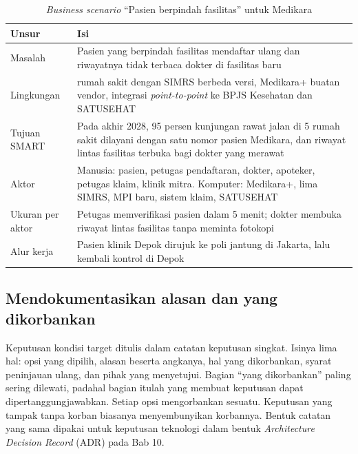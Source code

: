 \begin{table}[!htb]
  \centering
  \caption{\textit{Business scenario} ``Pasien berpindah fasilitas'' untuk Medikara}
  \label{tab:ch08-business-scenario}
  \begin{tabularx}{\textwidth}{>{\raggedright\arraybackslash}p{2.8cm}>{\raggedright\arraybackslash}X}
    \hline
    \textbf{Unsur} & \textbf{Isi} \\
    \hline
    Masalah & Pasien yang berpindah fasilitas mendaftar ulang dan riwayatnya tidak terbaca
      dokter di fasilitas baru \\
    \hline
    Lingkungan & 5 rumah sakit dengan SIMRS berbeda versi, Medikara+ buatan vendor,
      integrasi \textit{point-to-point} ke BPJS Kesehatan dan SATUSEHAT \\
    \hline
    Tujuan SMART & Pada akhir 2028, 95 persen kunjungan rawat jalan di 5 rumah sakit
      dilayani dengan satu nomor pasien Medikara, dan riwayat lintas fasilitas terbuka bagi
      dokter yang merawat \\
    \hline
    Aktor & Manusia: pasien, petugas pendaftaran, dokter, apoteker, petugas klaim, klinik
      mitra. Komputer: Medikara+, lima SIMRS, MPI baru, sistem klaim, SATUSEHAT \\
    \hline
    Ukuran per aktor & Petugas memverifikasi pasien dalam 5 menit; dokter membuka riwayat
      lintas fasilitas tanpa meminta fotokopi \\
    \hline
    Alur kerja & Pasien klinik Depok dirujuk ke poli jantung di Jakarta, lalu kembali
      kontrol di Depok \\
    \hline
  \end{tabularx}
\end{table}

\subsection*{Mendokumentasikan alasan dan yang dikorbankan}

Keputusan kondisi target ditulis dalam catatan keputusan singkat. Isinya lima hal: opsi
yang dipilih, alasan beserta angkanya, hal yang dikorbankan, syarat peninjauan ulang, dan
pihak yang menyetujui. Bagian ``yang dikorbankan'' paling sering dilewati, padahal bagian
itulah yang membuat keputusan dapat dipertanggungjawabkan. Setiap opsi mengorbankan sesuatu.
Keputusan yang tampak tanpa korban biasanya menyembunyikan korbannya. Bentuk catatan yang
sama dipakai untuk keputusan teknologi dalam bentuk \textit{Architecture Decision Record}
(ADR) pada Bab 10.

